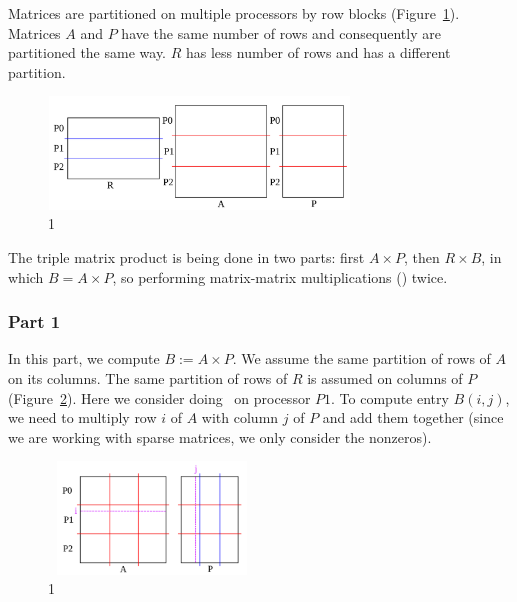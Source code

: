 
Matrices are partitioned on multiple processors by row blocks (Figure~\ref{fig:partition}). Matrices $A$ and $P$ have the same number of rows and consequently are partitioned the same way. $R$ has less number of rows and has a different partition.

\begin{figure}[tbh]
 \centering
 \includegraphics[width=8cm,height=3cm]{./figures/partition.pdf}
 \caption{1}
 \label{fig:partition}
\end{figure}

The triple matrix product is being done in two parts: first $A \times P$, then $R \times B$, in which $B = A \times P$, so performing matrix-matrix multiplications (\mm) twice.

\subsubsection{Part 1}

In this part, we compute $B := A \times P$. We assume the same partition of rows of $A$ on its columns. The same partition of rows of $R$ is assumed on columns of $P$ (Figure~\ref{fig:part1b}).
Here we consider doing \mm ~on processor $P1$. To compute entry $B(i, j)$, we need to multiply row $i$ of $A$ with column $j$ of $P$ and add them together (since we are working with sparse matrices, we only consider the nonzeros).

\begin{figure}[tbh]
 \centering
 \includegraphics[width=5.5cm,height=3cm]{./figures/part1b.pdf}
 \caption{1}
 \label{fig:part1b}
\end{figure}

